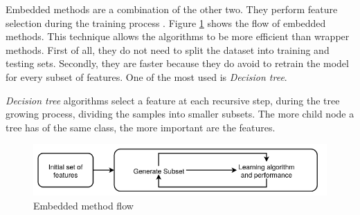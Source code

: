 Embedded methods are a combination of the other two. They perform feature selection during the training process \cite{guyon2003introduction}. Figure \ref{fig:embedded} shows the flow of embedded methods. This technique allows the algorithms to be more efficient than wrapper methods. First of all, they do not need to split the dataset into training and testing sets. Secondly, they are faster because they do avoid to retrain the model for every subset of features. One of the most used is \textit{Decision tree}.

\textit{Decision tree }algorithms select a feature at each recursive step, during the tree growing process, dividing the samples into smaller subsets. The more child node a tree has of the same class, the more important are the features.

\begin{figure}[!h]
	\centering
	\includegraphics[width=1.0\columnwidth]{embedded2}
	\caption{Embedded method flow}
	\label{fig:embedded}
\end{figure}